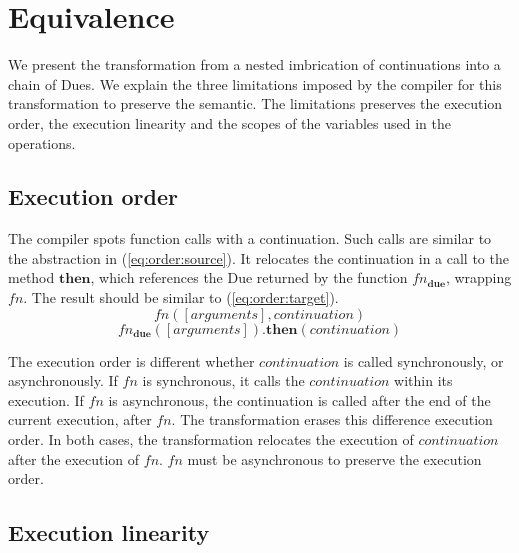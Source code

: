 \section{Equivalence} \label{section:equivalence}

We present the transformation from a nested imbrication of continuations into a chain of Dues.
We explain the three limitations imposed by the compiler for this transformation to preserve the semantic.
The limitations preserves the execution order, the execution linearity and the scopes of the variables used in the operations.

\subsection{Execution order}

The compiler spots function calls with a continuation.
Such calls are similar to the abstraction in (\ref{eq:order:source}).
It relocates the continuation in a call to the method $\textbf{then}$, which references the Due returned by the function $fn_\textbf{due}$, wrapping $fn$.
The result should be similar to (\ref{eq:order:target}).
\begin{equation} \label{eq:order:source}
fn([arguments], continuation)
\end{equation}
\begin{equation} \label{eq:order:target}
fn_\textbf{due}([arguments])\textbf{.then}(continuation)
\end{equation}

The execution order is different whether $continuation$ is called synchronously, or asynchronously.
If $fn$ is synchronous, it calls the $continuation$ within its execution.
If $fn$ is asynchronous, the continuation is called after the end of the current execution, after $fn$.
The transformation erases this difference execution order.
In both cases, the transformation relocates the execution of $continuation$ after the execution of $fn$.
$fn$ must be asynchronous to preserve the execution order.

\subsection{Execution linearity}

